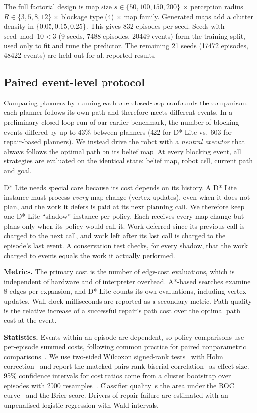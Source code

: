 \documentclass[11pt,a4paper]{article}
\begin{document}
The full factorial design is map size $s\in\{50,100,150,200\}$ $\times$ perception radius $R\in\{3,5,8,12\}$ $\times$ blockage type (4) $\times$ map family. Generated maps add a clutter density in $\{0.05,0.15,0.25\}$. This gives 832 episodes per seed. Seeds with $\text{seed}\bmod 10<3$ (9 seeds, \num{7488} episodes, \num{20449} events) form the training split, used only to fit and tune the predictor. The remaining 21 seeds (\num{17472} episodes, \num{48422} events) are held out for all reported results.

\subsection{Paired event-level protocol}\label{sec:protocol}
Comparing planners by running each one closed-loop confounds the comparison: each planner follows its own path and therefore meets different events. In a preliminary closed-loop run of our earlier benchmark, the number of blocking events differed by up to 43\% between planners (422 for D* Lite vs.\ 603 for repair-based planners). We instead drive the robot with a \emph{neutral executor} that always follows the optimal path on its belief map. At every blocking event, all strategies are evaluated on the identical state: belief map, robot cell, current path and goal.

D* Lite needs special care because its cost depends on its history. A D* Lite instance must process \emph{every} map change (vertex updates), even when it does not plan, and the work it defers is paid at its next planning call. We therefore keep one D* Lite ``shadow'' instance per policy. Each receives every map change but plans only when its policy would call it. Work deferred since its previous call is charged to the next call, and work left after its last call is charged to the episode's last event. A conservation test checks, for every shadow, that the work charged to events equals the work it actually performed.

\textbf{Metrics.} The primary cost is the number of edge-cost evaluations, which is independent of hardware and of interpreter overhead. A*-based searches examine 8 edges per expansion, and D* Lite counts its own evaluations, including vertex updates. Wall-clock milliseconds are reported as a secondary metric. Path quality is the relative increase of a successful repair's path cost over the optimal path cost at the event.

\textbf{Statistics.} Events within an episode are dependent, so policy comparisons use per-episode summed costs, following common practice for paired nonparametric comparisons~\cite{demsar2006}. We use two-sided Wilcoxon signed-rank tests~\cite{wilcoxon1945} with Holm correction~\cite{holm1979} and report the matched-pairs rank-biserial correlation~\cite{kerby2014} as effect size. 95\% confidence intervals for cost ratios come from a cluster bootstrap over episodes with \num{2000} resamples~\cite{efron1993}. Classifier quality is the area under the ROC curve~\cite{hanley1982} and the Brier score. Drivers of repair failure are estimated with an unpenalised logistic regression with Wald intervals.
\end{document}

